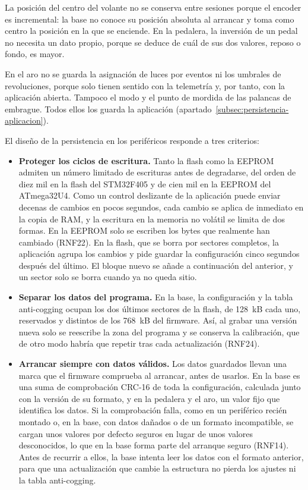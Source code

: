 La posición del centro del volante no se conserva entre sesiones porque el encoder es incremental: la base no conoce su posición absoluta al arrancar y toma como centro la posición en la que se enciende. En la pedalera, la inversión de un pedal no necesita un dato propio, porque se deduce de cuál de sus dos valores, reposo o fondo, es mayor.

En el aro no se guarda la asignación de luces por eventos ni los umbrales de revoluciones, porque solo tienen sentido con la telemetría y, por tanto, con la aplicación abierta. Tampoco el modo y el punto de mordida de las palancas de embrague. Todos ellos los guarda la aplicación (apartado~\ref{subsec:persistencia-aplicacion}).

El diseño de la persistencia en los periféricos responde a tres criterios:

\begin{itemize}
	\item \textbf{Proteger los ciclos de escritura.} Tanto la flash como la EEPROM admiten un número limitado de escrituras antes de degradarse, del orden de diez mil en la flash del STM32F405 y de cien mil en la EEPROM del ATmega32U4. Como un control deslizante de la aplicación puede enviar decenas de cambios en pocos segundos, cada cambio se aplica de inmediato en la copia de RAM, y la escritura en la memoria no volátil se limita de dos formas. En la EEPROM solo se escriben los bytes que realmente han cambiado (RNF22). En la flash, que se borra por sectores completos, la aplicación agrupa los cambios y pide guardar la configuración cinco segundos después del último. El bloque nuevo se añade a continuación del anterior, y un sector solo se borra cuando ya no queda sitio.
	\item \textbf{Separar los datos del programa.} En la base, la configuración y la tabla anti-cogging ocupan los dos últimos sectores de la flash, de 128~kB cada uno, reservados y distintos de los 768~kB del firmware. Así, al grabar una versión nueva solo se reescribe la zona del programa y se conserva la calibración, que de otro modo habría que repetir tras cada actualización (RNF24).
	\item \textbf{Arrancar siempre con datos válidos.} Los datos guardados llevan una marca que el firmware comprueba al arrancar, antes de usarlos. En la base es una suma de comprobación CRC-16 de toda la configuración, calculada junto con la versión de su formato, y en la pedalera y el aro, un valor fijo que identifica los datos. Si la comprobación falla, como en un periférico recién montado o, en la base, con datos dañados o de un formato incompatible, se cargan unos valores por defecto seguros en lugar de unos valores desconocidos, lo que en la base forma parte del arranque seguro (RNF14). Antes de recurrir a ellos, la base intenta leer los datos con el formato anterior, para que una actualización que cambie la estructura no pierda los ajustes ni la tabla anti-cogging.
\end{itemize}

